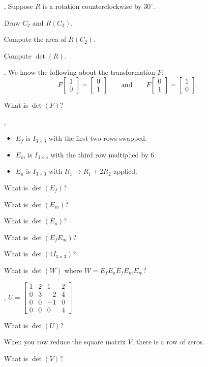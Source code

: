 \documentclass[letter]{article}
\newcommand{\mat}[1]{\begin{bmatrix}#1\end{bmatrix}}
\begin{document}
	\sep
	Suppose $R$ is a rotation counterclockwise by $30^\circ$.
	\begin{Enum}
	\item Draw $C_2$ and $R(C_2)$.
	\item Compute the area of $R(C_2)$.
		\item Compute $\det(R)$.
	\end{Enum}
	
	\sep
	We know the following about the transformation $F$:
	\[
		F\mat{1\\0}=\mat{0\\1}\qquad\text{and}\qquad F\mat{0\\1}=\mat{1\\0}.
	\]
	\begin{Enum}
		\item What is $\det(F)$?
	\end{Enum}

	\vspace{-.2in}
	\sep
	\vspace{-.3in}
	\begin{itemize}
		\item $E_f$ is $I_{3\times 3}$ with the first two rows swapped.
		\item $E_m$ is $I_{3\times 3}$ with the third row multiplied by 6.
		\item $E_a$ is $I_{3\times 3}$ with $R_1\to R_1+2R_2$ applied.
	\end{itemize}

	\begin{Enum}
		\item What is $\det(E_f)$?
		\item What is $\det(E_m)$?
		\item What is $\det(E_a)$?
		\item What is $\det(E_fE_m)$?
		\item What is $\det(4I_{3\times 3})$?
		\item What is $\det(W)$ where $W=E_fE_aE_fE_mE_m$?
	\end{Enum}

	\sep
	$U=\mat{1&2&1&2\\0&3&-2&4\\0&0&-1&0\\0&0&0&4}$
	\begin{Enum}
		\item What is $\det(U)$?
	\end{Enum}
	When you row reduce the square matrix $V$, there is a row of zeros.
	\begin{Enum}[resume]
		\item What is $\det(V)$?
	\end{Enum}
\end{document}
